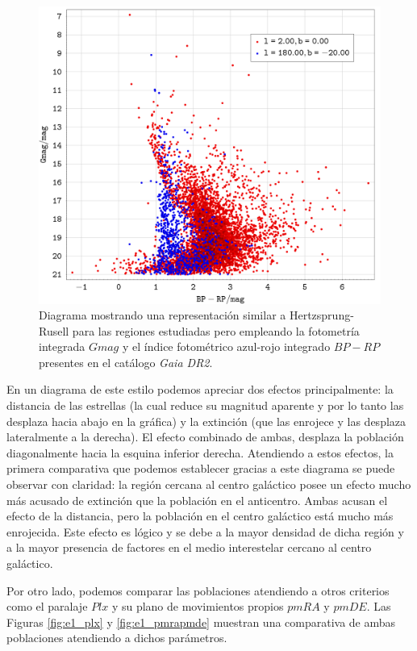\documentclass[a4paper,fleqn,usenatbib]{mnras}
\begin{document}
\begin{figure}
  \includegraphics[width=\linewidth]{img/ejercicio1_bprp_gmag}
  \caption{Diagrama mostrando una representación similar a Hertzsprung-Rusell para las regiones estudiadas pero empleando la fotometría integrada $Gmag$ y el índice fotométrico azul-rojo integrado $BP-RP$ presentes en el catálogo \emph{Gaia DR2}.}
  \label{fig:e1_bprpmag}
\end{figure}

En un diagrama de este estilo podemos apreciar dos efectos principalmente: la distancia de las estrellas (la cual reduce su magnitud aparente y por lo tanto las desplaza hacia abajo en la gráfica) y la extinción (que las enrojece y las desplaza lateralmente a la derecha). El efecto combinado de ambas, desplaza la población diagonalmente hacia la esquina inferior derecha. Atendiendo a estos efectos, la primera comparativa que podemos establecer gracias a este diagrama se puede observar con claridad: la región cercana al centro galáctico posee un efecto mucho más acusado de extinción que la población en el anticentro. Ambas acusan el efecto de la distancia, pero la población en el centro galáctico está mucho más enrojecida. Este efecto es lógico y se debe a la mayor densidad de dicha región y a la mayor presencia de factores en el medio interestelar cercano al centro galáctico.

Por otro lado, podemos comparar las poblaciones atendiendo a otros criterios como el paralaje $Plx$ y su plano de movimientos propios $pmRA$ y $pmDE$. Las Figuras \ref{fig:e1_plx} y \ref{fig:e1_pmrapmde} muestran una comparativa de ambas poblaciones atendiendo a dichos parámetros.
\end{document}
